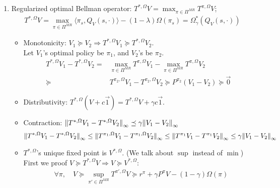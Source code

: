 \documentclass[a4paper]{article}
\begin{document}
\begin{enumerate}
    \item Regularized optimal Bellman operator: $ T^{*,\Omega}V = \max_{\pi \in \Pi^{MR}} T^{\pi,\Omega}V $;
        \begin{align*}
            T^{*,\Omega}V = \max_{\pi \in \Pi^{MR}} \langle \pi_s, Q_V(s, \cdot) \rangle - (1 - \lambda)\Omega(\pi_s)
            = \Omega^{*}_{\gamma}( Q_{V}(s,\cdot))
        \end{align*}
        \begin{itemize}
            \item Monotonicity: $ V_1 \succeq V_2 \Rightarrow T^{*,\Omega} V_1 \succeq T^{*, \Omega} V_2 $.\\
                Let $ V_1 $'s optimal policy be $ \pi_1 $, and $ V_2 $'s be $ \pi_2 $.
                \begin{align*}
                    T^{*,\Omega} V_1 - T^{*, \Omega} V_2 =& \max_{\pi \in \Pi^{MR}} T^{\pi,\Omega}V_1 -  \max_{\pi \in \Pi^{MR}} T^{\pi,\Omega}V_2\\
                    \succeq& T^{\pi_2, \Omega}V_1 - T^{\pi_2, \Omega}V_2 \succeq P^{\pi_2} (V_1 - V_2) \succeq \vec{0}
                \end{align*}
            \item Distributivity: $ T^{*,\Omega}(V + c \vec{1}) = T^{*, \Omega}V + \gamma c \vec{1} $.
            \item Contraction: $ {\Arrowvert T^{*, \Omega}V_1 - T^{*, \Omega}V_2 \Arrowvert}_\infty \preceq \gamma {\Arrowvert V_1 - V_2 \Arrowvert}_\infty $
                \begin{align*}
                    {\Arrowvert T^{*, \Omega}V_1 - T^{*, \Omega}V_2 \Arrowvert}_\infty
                    \le {\Arrowvert T^{\pi_1,\Omega} V_1 - T^{\pi_1, \Omega}V_2 \Arrowvert}_\infty
                    \le {\Arrowvert T^{\pi_1} V_1 - T^{\pi_1} V_2 \Arrowvert}_\infty
                    \le \gamma {\Arrowvert V_1 - V_2 \Arrowvert}_\infty
                \end{align*}
            \item $ T^{*, \Omega} $'s unique fixed point is $ V^{*,\Omega} $. (We talk about $ \sup $ instead of $ \min $)\\
                First we proof $ V \succeq T^{*,\Omega} V \Rightarrow V \succeq V^{*,\Omega}$:
                \begin{align*}
                    &\forall \pi, \quad 
                    V \succeq \sup_{\pi' \in \Pi^{MR}} T^{\pi', \Omega} V \succeq r^\pi + \gamma P^{\pi} V - (1-\gamma) \Omega(\pi)\\

\end{align*}
\end{itemize}
\end{enumerate}
\end{document}
